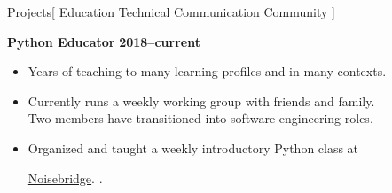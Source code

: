 \documentclass[11pt,a4paper]{article}
\newenvironment{worksection}[3]{
    \begin{addmargin}[0.5em]{0em}
    {\large\bfseries #1} \hfill {\bfseries #2}\\%
    \hspace*{1em}#3
    \begin{itemize}
        [label=-, topsep=0pt, itemsep=0.5ex, parsep=0pt, leftmargin=1em]
}{
    \end{itemize}
    \end{addmargin}
    \medskip
}
\newenvironment{headedsection}[2]{
    \begin{addmargin}[0.5em]{0em}
    {\large\bfseries #1} \hfill {\bfseries #2}%
    \begin{itemize}
        [label=-, topsep=0pt, itemsep=0.5ex, parsep=0pt, leftmargin=1em]
}{
    \end{itemize}
    \end{addmargin}
    \medskip
}
\newcommand{\archive}{https://web.archive.org/web}
\newcommand{\FadleyGroup}{
  \href{\archive/20201001085257/http://fadley.physics.ucdavis.edu/}
       {Fadley Group}
}
\newcommand{\Noisebridge}{
  \href{https://www.noisebridge.net/}{Noisebridge}.
}
\begin{document}

\begin{mysection}{Projects}[
    Education \textbullet{} Technical Communication \textbullet{} Community
]

\begin{headedsection}
     {Python Educator}
     {2018--current}

    \item Years of teaching to many learning profiles and in many contexts.
    \item Currently runs a weekly working group with friends and family.
    \\    Two members have transitioned into software engineering roles.
    \item Organized and taught a weekly introductory Python class at
          \Noisebridge{}.

  \end{headedsection}


\end{mysection}
\end{document}
